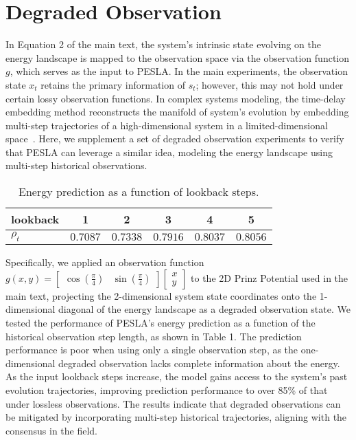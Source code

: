 \section{Degraded Observation} \label{sec:degraded}

In Equation 2 of the main text, the system's intrinsic state evolving on the energy landscape is mapped to the observation space via the observation function $g$, which serves as the input to PESLA. In the main experiments, the observation state $x_t$ retains the primary information of $s_t$; however, this may not hold under certain lossy observation functions. In complex systems modeling, the time-delay embedding method reconstructs the manifold of system's evolution by embedding multi-step trajectories of a high-dimensional system in a limited-dimensional space~\citep{wu2024predicting}. Here, we supplement a set of degraded observation experiments to verify that PESLA can leverage a similar idea, modeling the energy landscape using multi-step historical observations.

\begin{table}[!ht]
    \centering
    \caption{Energy prediction as a function of lookback steps.}
    \label{tab:loss_g}
    \renewcommand{\arraystretch}{1.5}
    \begin{tabular}{l|ccccc}
        \hline
        lookback & 1 & 2 & 3 & 4 & 5 \\
        \hline
        $\rho_t$ & $0.7087$ & $0.7338$ & $0.7916$ & $0.8037$ & $0.8056$ \\
        \hline
    \end{tabular}
\end{table}

Specifically, we applied an observation function $g(x, y) = \begin{bmatrix} \cos(\frac{\pi}{4}) & \sin(\frac{\pi}{4}) \end{bmatrix} \begin{bmatrix} x \\ y \end{bmatrix}$ to the 2D Prinz Potential used in the main text, projecting the 2-dimensional system state coordinates onto the 1-dimensional diagonal of the energy landscape as a degraded observation state. We tested the performance of PESLA’s energy prediction as a function of the historical observation step length, as shown in Table 1. The prediction performance is poor when using only a single observation step, as the one-dimensional degraded observation lacks complete information about the energy. As the input lookback steps increase, the model gains access to the system's past evolution trajectories, improving prediction performance to over 85\% of that under lossless observations. The results indicate that degraded observations can be mitigated by incorporating multi-step historical trajectories, aligning with the consensus in the field.